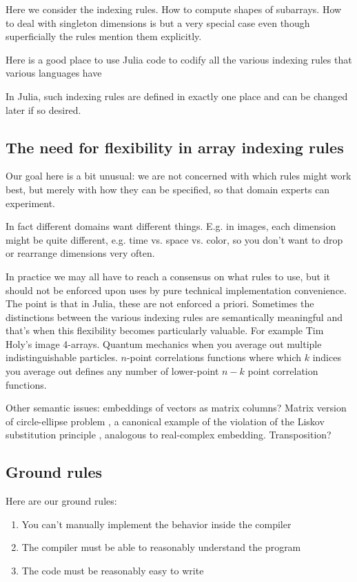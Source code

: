 \documentclass[preprint]{sigplanconf}
\begin{document}
Here we consider the indexing rules. How to compute shapes of subarrays. How
to deal with singleton dimensions is but a very special case even though
superficially the rules mention them explicitly.

Here is a good place to use Julia code to codify all the various indexing
rules that various languages have

In Julia, such indexing rules are defined in exactly one place and can be
changed later if so desired.

\subsection{The need for flexibility in array indexing rules}

Our goal here is a bit unusual: we are not concerned with which rules might
work best, but merely with how they can be specified, so that domain experts
can experiment.

In fact different domains want different things. E.g. in images, each
dimension might be quite different, e.g. time vs. space vs. color, so you
don't want to drop or rearrange dimensions very often.

In practice we may all have to reach a consensus on what rules to use, but it
should not be enforced upon uses by pure technical implementation convenience.
The point is that in Julia, these are not enforced a priori. Sometimes the
distinctions between the various indexing rules are semantically meaningful
and that's when this flexibility becomes particularly valuable. For example
Tim Holy's image 4-arrays. Quantum mechanics when you average out multiple
indistinguishable particles. $n$-point correlations functions where which $k$
indices you average out defines any number of lower-point $n-k$ point
correlation functions.

Other semantic issues: embeddings of vectors as matrix columns? Matrix version
of circle-ellipse problem \cite{Halbert:1987ut}, a canonical example of the
violation of the Liskov substitution principle \cite{Liskov:1987da}, analogous
to real-complex embedding. Transposition?

\subsection{Ground rules}
Here are our ground rules:

\begin{enumerate}
\item You can't manually implement the behavior inside the compiler
\item The compiler must be able to reasonably understand the program
\item The code must be reasonably easy to write
\end{enumerate}
\end{document}
